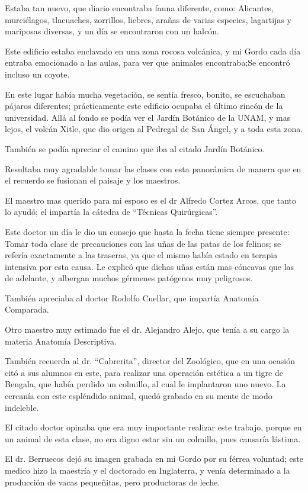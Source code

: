 \documentclass[letterpaper, 12pt]{book}
\begin{document}
Estaba tan nuevo, que diario encontraba fauna diferente, como: Alicantes, murciélagos, tlacuaches, zorrillos, liebres, arañas de varias especies, lagartijas y mariposas diversas, y un día se encontraron con un halcón.

Este edificio estaba enclavado en una zona rocosa volcánica, y mi Gordo cada día entraba emocionado a las aulas, para ver que animales encontraba;Se encontró incluso un coyote.

En este lugar había mucha vegetación, se sentía fresco, bonito, se escuchaban pájaros diferentes; prácticamente este edificio ocupaba el último rincón de la universidad.
Allá al fondo se podía ver el Jardín Botánico de la UNAM, y mas lejos, el volcán Xitle, que dio origen al Pedregal de San Ángel, y a toda esta zona.

También se podía apreciar el camino que iba al citado Jardín Botánico.

Resultaba muy agradable tomar las clases con esta panorámica de manera que en el recuerdo se fusionan el paisaje y los maestros.

El maestro mas querido para mi esposo es el dr Alfredo Cortez Arcos, que tanto lo ayudó; el impartía la cátedra de ``Técnicas Quirúrgicas''.

Este doctor un día le dio un  consejo que hasta la fecha tiene siempre presente: Tomar toda clase de precauciones con las uñas de las patas de los felinos; se refería exactamente a las traseras, ya que el mismo había estado en terapia intensiva por esta causa. Le explicó que dichas uñas están mas cóncavas que las de adelante, y albergan muchos gérmenes patógenos muy peligrosos.

También apreciaba al doctor Rodolfo Cuellar, que impartía Anatomía Comparada.

Otro maestro muy estimado fue el dr. Alejandro Alejo, que tenía a su cargo la materia Anatomía Descriptiva.

También recuerda al dr. ``Cabrerita'', director del Zoológico, que en una ocasión citó a sus alumnos en este, para realizar una operación estética a un tigre de Bengala, que había perdido un colmillo, al cual le implantaron uno nuevo. La cercanía con este espléndido animal, quedó grabado en su mente de modo
indeleble.

El  citado doctor opinaba que era muy importante realizar este trabajo, porque en un animal de esta clase, no era digno estar sin un colmillo, pues causaría lástima.

El dr. Berruecos dejó su imagen grabada en mi Gordo por su férrea voluntad; este medico hizo la maestría y el doctorado en Inglaterra, y venía determinado a la producción de vacas pequeñitas, pero productoras de leche. 
\end{document}
